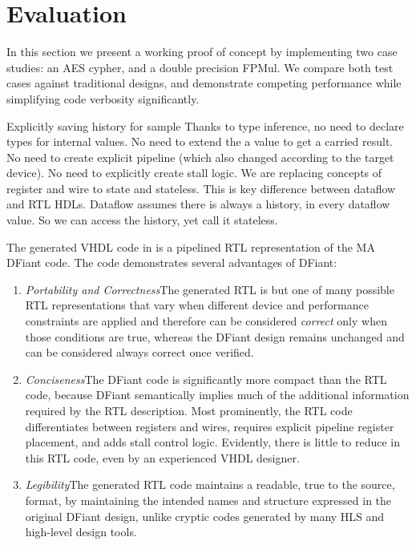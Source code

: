 \section{Evaluation}
\label{sec:evaluation}
In this section we present a working proof of concept by implementing two case studies: an AES cypher, and a double precision FPMul. We compare both test cases against traditional designs, and demonstrate competing performance while simplifying code verbosity significantly. 

Explicitly saving history for sample
Thanks to type inference, no need to declare types for internal values.
No need to extend the a value to get a carried result.
No need to create explicit pipeline (which also changed according to the target device).
No need to explicitly create stall logic.
We are replacing concepts of register and wire to state and stateless. This is key difference between dataflow 
and RTL HDLs. Dataflow assumes there is always a history, in every dataflow value. So we can access the history, yet call it stateless.

The generated VHDL code in  is a pipelined RTL representation of the MA DFiant code. The code demonstrates several advantages of DFiant:
\begin{enumerate}[leftmargin=*]
	\item \textit{Portability and Correctness}\quad The generated RTL is but one of many possible RTL representations that vary when different device and performance constraints are applied and therefore can be considered \textit{correct} only when those conditions are true, whereas the DFiant design remains unchanged and can be considered always correct once verified.  
	\item \textit{Conciseness}\quad  The DFiant code is significantly more compact than the RTL code, because DFiant semantically implies much of the additional information required by the RTL description. Most prominently, the RTL code differentiates between registers and wires, requires explicit pipeline register placement, and adds stall control logic. Evidently, there is little to reduce in this RTL code, even by an experienced VHDL designer.
	\item \textit{Legibility}\quad The generated RTL code maintains a readable, true to the source, format, by maintaining the intended names and structure expressed in the original DFiant design, unlike cryptic codes generated by many HLS and high-level design tools.  
\end{enumerate} 


